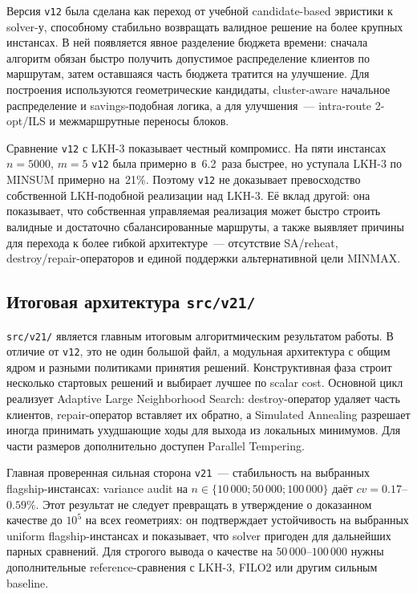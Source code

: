\documentclass[14pt,a4paper]{extarticle}
\begin{document}
Версия \texttt{v12} была сделана как переход от учебной candidate-based эвристики к solver-у, способному стабильно возвращать валидное решение на более крупных инстансах. В ней появляется явное разделение бюджета времени: сначала алгоритм обязан быстро получить допустимое распределение клиентов по маршрутам, затем оставшаяся часть бюджета тратится на улучшение. Для построения используются геометрические кандидаты, cluster-aware начальное распределение и savings-подобная логика, а для улучшения~--- intra-route 2-opt/ILS и межмаршрутные переносы блоков.

Сравнение \texttt{v12} с LKH-3 показывает честный компромисс. На пяти инстансах $n=5000$, $m=5$ \texttt{v12} была примерно в~6.2~раза быстрее, но уступала LKH-3 по MINSUM примерно на~21\%. Поэтому \texttt{v12} не доказывает превосходство собственной LKH-подобной реализации над LKH-3. Её вклад другой: она показывает, что собственная управляемая реализация может быстро строить валидные и достаточно сбалансированные маршруты, а также выявляет причины для перехода к более гибкой архитектуре~--- отсутствие SA/reheat, destroy/repair-операторов и единой поддержки альтернативной цели MINMAX.

\subsection{Итоговая архитектура \texttt{src/v21/}}

\texttt{src/v21/} является главным итоговым алгоритмическим результатом работы. В отличие от \texttt{v12}, это не один большой файл, а модульная архитектура с общим ядром и разными политиками принятия решений. Конструктивная фаза строит несколько стартовых решений и выбирает лучшее по scalar cost. Основной цикл реализует Adaptive Large Neighborhood Search: destroy-оператор удаляет часть клиентов, repair-оператор вставляет их обратно, а Simulated Annealing разрешает иногда принимать ухудшающие ходы для выхода из локальных минимумов. Для части размеров дополнительно доступен Parallel Tempering.

Главная проверенная сильная сторона \texttt{v21}~--- стабильность на выбранных flagship-инстансах: variance audit на $n \in \{10\,000; 50\,000; 100\,000\}$ даёт $cv = 0.17$--$0.59\%$. Этот результат не следует превращать в утверждение о доказанном качестве до $10^5$ на всех геометриях: он подтверждает устойчивость на выбранных uniform flagship-инстансах и показывает, что solver пригоден для дальнейших парных сравнений. Для строгого вывода о качестве на $50\,000$--$100\,000$ нужны дополнительные reference-сравнения с LKH-3, FILO2 или другим сильным baseline.
\end{document}
